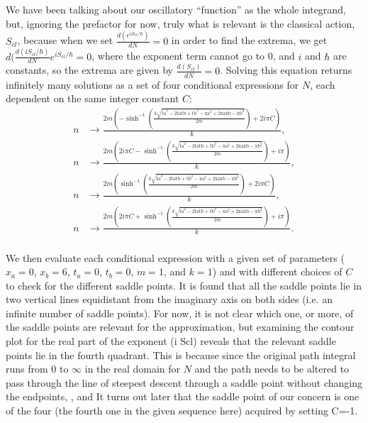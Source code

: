 \documentclass[12pt]{revtex4}
\begin{document}
We have been talking about our oscillatory ``function'' as the whole integrand, but, ignoring the prefactor for now, truly what is relevant is the classical action, $S_{cl}$, because when we set $\frac{d(e^{i S_{cl}/\hbar})}{dN}=0$ in order to find the extrema, we get $d(\frac{d(i S_{cl}/\hbar)}{dN} e^{i S_{cl}/\hbar}=0$, where the exponent term cannot go to 0, and $i$ and $\hbar$ are constants, so the extrema are given by $\frac{d(S_{cl})}{dN}=0$. Solving this equation returns infinitely many solutions as a set of four conditional expressions for $N$, each dependent on the same integer constant $C$:
\begin{align*}
n&\to \frac{2 m \left(-\sinh ^{-1}\left(\frac{k \sqrt{\text{ta}^2-2 \text{ta} \text{tb}+\text{tb}^2-\text{xa}^2+2 \text{xa} \text{xb}-\text{xb}^2}}{2 m}\right)+2 i \pi  C\right)}{k},\\
n&\to \frac{2 m \left(2 i \pi  C-\sinh ^{-1}\left(\frac{k \sqrt{\text{ta}^2-2 \text{ta} \text{tb}+\text{tb}^2-\text{xa}^2+2 \text{xa} \text{xb}-\text{xb}^2}}{2 m}\right)+i \pi \right)}{k},\\
n&\to \frac{2 m \left(\sinh ^{-1}\left(\frac{k \sqrt{\text{ta}^2-2 \text{ta} \text{tb}+\text{tb}^2-\text{xa}^2+2 \text{xa} \text{xb}-\text{xb}^2}}{2 m}\right)+2 i \pi  C\right)}{k},\\
n&\to \frac{2 m \left(2 i \pi  C+\sinh ^{-1}\left(\frac{k \sqrt{\text{ta}^2-2 \text{ta} \text{tb}+\text{tb}^2-\text{xa}^2+2 \text{xa} \text{xb}-\text{xb}^2}}{2 m}\right)+i \pi \right)}{k}.\\
\end{align*}

We then evaluate each conditional expression with a given set of parameters ($x_a=0$, $x_b=6$, $t_a=0$, $t_b=0$, $m=1$, and $k=1$) and with different choices of $C$ to check for the different saddle points. It is found that all the saddle points lie in two vertical lines equidistant from the imaginary axis on both sides (i.e. an infinite number of saddle points). For now, it is not clear which one, or more, of the saddle points are relevant for the approximation, but examining the contour plot for the real part of the exponent (i Scl) reveals that the relevant saddle points lie in the fourth quadrant. This is because since the original path integral runs from 0 to $\infty$ in the real domain for $N$ and the path needs to be altered to pass through the line of steepest descent through a saddle point without changing the endpoints, , and It turns out later that the saddle point of our concern is one of the four (the fourth one in the given sequence here) acquired by setting C=-1.
\end{document}
